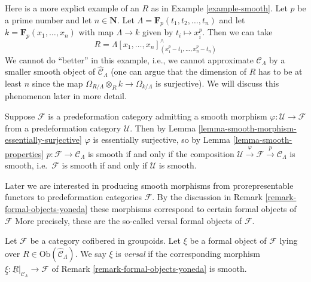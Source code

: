 \begin{example}
\label{example-smooth-explicit}
Here is a more explict example of an $R$ as in
Example \ref{example-smooth}.
Let $p$ be a prime number and let $n \in \mathbf{N}$.
Let $\Lambda = \mathbf{F}_p(t_1, t_2, \ldots, t_n)$ and let
$k = \mathbf{F}_p(x_1, \ldots, x_n)$ with map $\Lambda \to k$ given
by $t_i \mapsto x_i^p$. Then we can take
$$
R = \Lambda[x_1, \ldots, x_n]^\wedge_{(x_1^p - t_1, \ldots, x_n^p - t_n)}
$$
We cannot do ``better'' in this example, i.e., we cannot approximate
$\mathcal{C}_\Lambda$ by a smaller smooth object of
$\widehat{\mathcal{C}}_\Lambda$ (one can argue that the dimension of $R$
has to be at least $n$ since the map
$\Omega_{R/\Lambda} \otimes_R k \to \Omega_{k/\Lambda}$ is
surjective). We will discuss this phenomenon later in more detail.
\end{example}

\begin{remark}
\label{remark-smooth-on-top}
Suppose $\mathcal{F}$ is a predeformation category admitting a smooth morphism 
$\varphi : \mathcal U \to \mathcal{F}$ from a predeformation category 
$\mathcal{U}$.  Then by
Lemma \ref{lemma-smooth-morphism-essentially-surjective} 
$\varphi$ is essentially surjective, so by
Lemma \ref{lemma-smooth-properties} 
$p: \mathcal{F} \to \mathcal{C}_\Lambda$ is smooth if and only if the 
composition $\mathcal U \xrightarrow{\varphi} \mathcal{F} \xrightarrow{p} 
\mathcal{C}_\Lambda$ is smooth, i.e.\ $\mathcal{F}$ is smooth if and only if 
$\mathcal{U}$ is smooth.
\end{remark}

\noindent
Later we are interested in producing smooth morphisms from
prorepresentable functors to predeformation categories $\mathcal{F}$.
By the discussion in
Remark \ref{remark-formal-objects-yoneda}
these morphisms correspond to certain formal objects of $\mathcal{F}$
More precisely, these are the so-called versal formal objects of $\mathcal{F}$.

\begin{definition}
\label{definition-versal}
Let $\mathcal{F}$ be a category cofibered in groupoids.  Let $\xi$ be a formal 
object of $\mathcal{F}$ lying over $R \in \text{Ob}(\widehat{\mathcal 
C}_\Lambda)$.  We say $\xi$ is {\it versal} if the corresponding morphism 
$\underline{\xi}: \underline{R}|_{\mathcal{C}_\Lambda} \to \mathcal{F}$ 
of Remark \ref{remark-formal-objects-yoneda} is smooth.
\end{definition}

